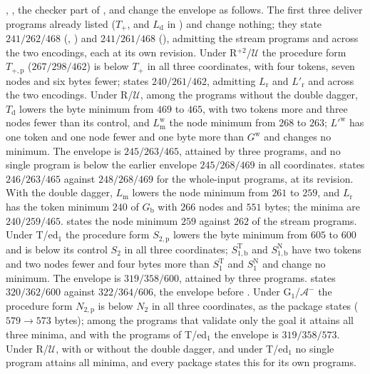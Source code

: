 , , the checker part of
,  and 
change the envelope as follows. The first three deliver programs already listed
($T_{+}$, and $L_{\mathrm d}$ in ) and change nothing; they
state $241/262/468$ (, ) and
$241/261/468$ (), admitting the stream programs and across
the two encodings, each at its own revision. Under R$^{+2}$/$\mathcal U$ the
procedure form $T_{+,\mathrm p}$ ($267/298/462$) is below $T_{+}$ in all three
coordinates, with four tokens, seven nodes and six bytes fewer;
 states $240/261/462$, admitting $L_{\mathrm r}$ and
$L'_{\mathrm r}$ and across the two encodings. Under R/$\mathcal U$, among the
programs without the double dagger, $T_{\mathrm d}$ lowers the byte minimum from
$469$ to $465$, with two tokens more and three nodes fewer than its control, and
$L^{\mathrm w}_{\mathrm m}$ the node minimum from $268$ to $263$; $L'^{\mathrm w}$
has one token and one node fewer and one byte more than $G^{\mathrm w}$ and changes
no minimum. The envelope is $245/263/465$, attained by three programs, and no
single program is below the earlier envelope $245/268/469$ in all coordinates.
 states $246/263/465$ against $248/268/469$ for the
whole-input programs, at its revision. With the double dagger, $L_{\mathrm m}$
lowers the node minimum from $261$ to $259$, and $L_{\mathrm r}$ has the token
minimum $240$ of $G_{\mathrm b}$ with $266$ nodes and $551$ bytes; the minima are
$240/259/465$.  states the node minimum $259$ against $262$
of the stream programs. Under T/ed$_1$ the procedure form $S_{2,\mathrm p}$ lowers
the byte minimum from $605$ to $600$ and is below its control $S_2$ in all three
coordinates; $S^{\mathrm T}_{1,\mathrm b}$ and $S^{\mathrm N}_{1,\mathrm b}$ have two
tokens and two nodes fewer and four bytes more than $S^{\mathrm T}_1$ and
$S^{\mathrm N}_1$ and change no minimum. The envelope is $319/358/600$, attained by
three programs.  states $320/362/600$ against
$322/364/606$, the envelope before . Under
G$_1$/$\mathcal A^{-}$ the procedure form $N_{2,\mathrm p}$ is below $N_2$ in all
three coordinates, as the package states ($579\to 573$ bytes); among the programs
that validate only the goal it attains all three minima, and with the programs of
T/ed$_1$ the envelope is $319/358/573$. Under R/$\mathcal U$, with or without the
double dagger, and under T/ed$_1$ no single program attains all minima, and every
package states this for its own programs.

